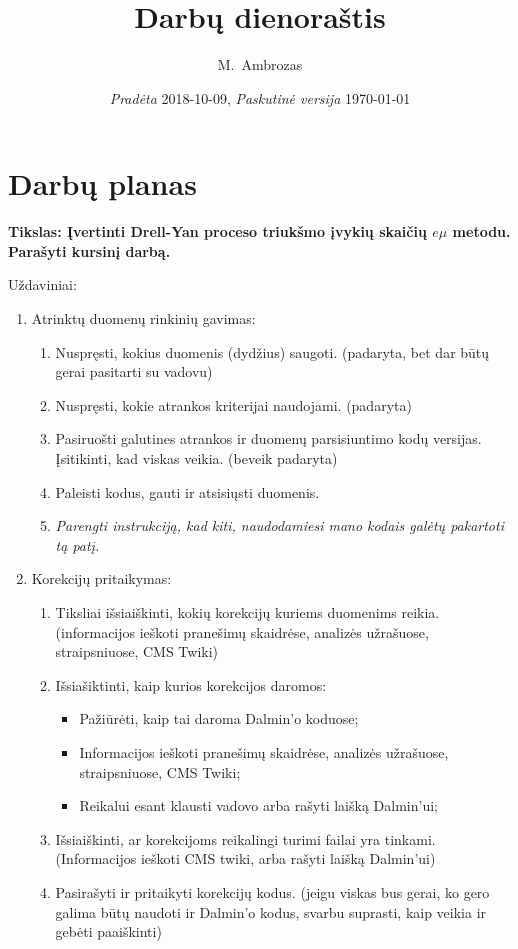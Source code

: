\documentclass[a4paper, 12pt]{article}
\begin{document}

\title{Darbų dienoraštis}
\author{M.\ Ambrozas}
\date{\textit{Pradėta} 2018-10-09, \textit{Paskutinė versija} \today}
\maketitle
\pagebreak

\section{Darbų planas}
\textbf{Tikslas: Įvertinti Drell-Yan proceso triukšmo įvykių skaičių $e\mu$ metodu. Parašyti kursinį darbą.}

Uždaviniai:
\begin{enumerate}
	\item Atrinktų duomenų rinkinių gavimas:
	\begin{enumerate}
		\item Nuspręsti, kokius duomenis (dydžius) saugoti. (padaryta, bet dar būtų gerai pasitarti su vadovu)
		\item Nuspręsti, kokie atrankos kriterijai naudojami. (padaryta)
		\item Pasiruošti galutines atrankos ir duomenų parsisiuntimo kodų versijas.
		Įsitikinti, kad viskas veikia. (beveik padaryta)
		\item Paleisti kodus, gauti ir atsisiųsti duomenis.
		\item \textit{Parengti instrukciją, kad kiti, naudodamiesi mano kodais galėtų pakartoti tą patį.}
	\end{enumerate}
	
	\item Korekcijų pritaikymas:
	\begin{enumerate}
		\item Tiksliai išsiaiškinti, kokių korekcijų kuriems duomenims reikia.
		(informacijos ieškoti pranešimų skaidrėse, analizės užrašuose, straipsniuose, CMS Twiki)
		\item Išsiašiktinti, kaip kurios korekcijos daromos:
		\begin{itemize}
			\item Pažiūrėti, kaip tai daroma Dalmin'o koduose;
			\item Informacijos ieškoti pranešimų skaidrėse, analizės užrašuose, straipsniuose, CMS Twiki;
			\item Reikalui esant klausti vadovo arba rašyti laišką Dalmin'ui;
		\end{itemize}
		\item Išsiaiškinti, ar korekcijoms reikalingi turimi failai yra tinkami.
		(Informacijos ieškoti CMS twiki, arba rašyti laišką Dalmin'ui)
		\item Pasirašyti ir pritaikyti korekcijų kodus. (jeigu viskas bus gerai, ko gero galima
		būtų naudoti ir Dalmin'o kodus, svarbu suprasti, kaip veikia ir gebėti paaiškinti)
	\end{enumerate}
	

\end{enumerate}
\end{document}
